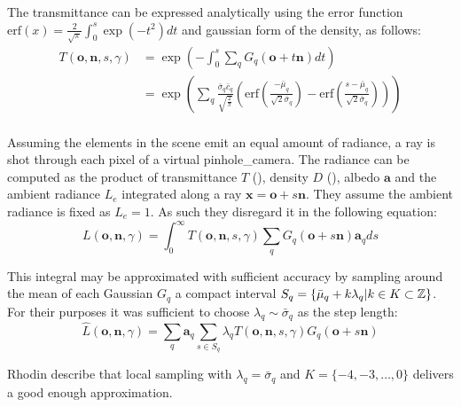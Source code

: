 \documentclass[a4paper, 11pt]{memoir}
\newcommand*{\erf}{\text{erf}}
\begin{document}
    The \gls{transmittance} can be expressed analytically using the error function
    $\erf{(x)} = \frac{2}{\sqrt{\pi}}\int_0^s \exp{(-t^2)} dt$ and gaussian form of the density, as follows:
    \begin{equation}
        \begin{aligned}
            T(\mathbf{o}, \mathbf{n}, s, \gamma) &= \exp{\left( -\int_0^s
                \sum_q G_q(\mathbf{o} + t\mathbf{n} ) dt \right)}\\
            &= \exp{\left( \sum_q \frac{\bar{\sigma}_q \bar{c}_q}{\sqrt{\frac{2}{\pi}}}
            \left( \erf{\left( \frac{-\bar{\mu}_q}{\sqrt{2}\bar{\sigma}_q} \right)}
            - \erf{\left( \frac{s - \bar{\mu}_q}{\sqrt{2}\bar{\sigma}_q} \right)} \right) \right)}\\
        \end{aligned}
        \label{eq:transmittance_analytical}
    \end{equation}

    Assuming the elements in the scene emit an equal amount of \gls{radiance}, a ray is shot through each pixel of a virtual
    \gls{pinhole_camera}. The \gls{radiance} can be computed as the product of \gls{transmittance} $T$ (),
    density $D$ (), \gls{albedo} $\mathbf{a}$ and the ambient \gls{radiance} $L_e$ integrated along a ray
    $\mathbf{x} = \mathbf{o} + s\mathbf{n}$. They assume the ambient \gls{radiance} is fixed as $L_e = 1$. As such they
    disregard it in the following equation:
    \begin{equation}
        L(\mathbf{o}, \mathbf{n}, \gamma) = \int_0^\infty T(\mathbf{o}, \mathbf{n}, s, \gamma)
            \sum_q G_q(\mathbf{o} + s\mathbf{n})\mathbf{a}_q ds
    \end{equation}
    
    This integral may be approximated with sufficient accuracy by sampling around the mean of each Gaussian $G_q$
    a compact interval $S_q = \{ \bar{\mu}_q + k\lambda_q | k \in K \subset \mathbb{Z} \}$. For their purposes it was sufficient
    to choose $\lambda_q \sim \bar{\sigma}_q$ as the step length:
    \begin{equation}
        \hat{L}(\mathbf{o}, \mathbf{n}, \gamma) = \sum_q \mathbf{a}_q \sum_{s \in S_q}
            \lambda_q T(\mathbf{o}, \mathbf{n}, s, \gamma)G_q(\mathbf{o} + s\mathbf{n})
        \label{eq:radiance}
    \end{equation}

    Rhodin \etal describe that local sampling with $\lambda_q = \bar{\sigma}_q$ and
    $K = \{ -4, -3, \dots, 0 \}$ delivers a good enough approximation.
\end{document}
